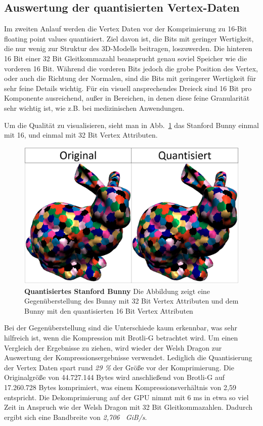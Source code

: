 \subsection{Auswertung der quantisierten Vertex-Daten}
\label{subsec:auswertung2}
Im zweiten Anlauf werden die Vertex Daten vor der Komprimierung zu 16-Bit floating point values quantisiert.
Ziel davon ist, die Bits mit geringer Wertigkeit, die nur wenig zur Struktur des 3D-Modells beitragen, loszuwerden.
Die hinteren 16 Bit einer 32 Bit Gleitkommazahl beansprucht genau soviel Speicher wie die vorderen 16 Bit.
Während die vorderen Bits jedoch die grobe Position des Vertex, oder auch die Richtung der Normalen, sind die Bits mit geringerer Wertigkeit für sehr feine Details wichtig.
Für ein visuell ansprechendes Dreieck sind 16 Bit pro Komponente ausreichend, außer in Bereichen, in denen diese feine Granularität sehr wichtig ist, wie z.B. bei medizinischen Anwendungen. \newline

Um die Qualität zu visualisieren, sieht man in Abb.~\ref{fig:bunny} das Stanford Bunny einmal mit 16, und einmal mit 32 Bit Vertex Attributen.

\begin{figure}[htb]
  \centering  
  \includegraphics[scale=0.45]{Bilder/bunny_quantisiert.png}
  \caption[Quantisiertes Stanford Bunny]{\textbf{Quantisiertes Stanford Bunny} Die Abbildung zeigt eine Gegenüberstellung des Bunny mit 32 Bit Vertex Attributen und dem Bunny mit den quantisierten 16 Bit Vertex Attributen }
  \label{fig:bunny}
\end{figure}

Bei der Gegenüberstellung sind die Unterschiede kaum erkennbar, was sehr hilfreich ist, wenn die Kompression mit Brotli-G betrachtet wird.
Um einen Vergleich der Ergebnisse zu ziehen, wird wieder der Welsh Dragon zur Auswertung der Kompressionsergebnisse verwendet.
Lediglich die Quantisierung der Vertex Daten spart rund \textit{29 \%} der Größe vor der Komprimierung.
Die Originalgröße von 44.727.144 Bytes wird anschließend von Brotli-G auf 17.260.728 Bytes komprimiert, was einem Kompressionsverhältnis von 2,59 entspricht.
Die Dekomprimierung auf der GPU nimmt mit 6 ms in etwa so viel Zeit in Anspruch wie der Welsh Dragon mit 32 Bit Gleitkommazahlen.
Dadurch ergibt sich eine Bandbreite von \textit{2,706 \ GiB/s}. \newline

